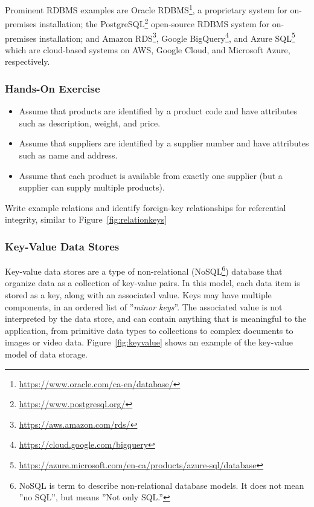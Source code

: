 Prominent RDBMS examples are Oracle RDBMS\footnote{\url{https://www.oracle.com/ca-en/database/}}, a proprietary system for on-premises installation; the PostgreSQL\footnote{\url{https://www.postgresql.org/}} open-source RDBMS system for on-premises installation; and Amazon RDS\footnote{\url{https://aws.amazon.com/rds/}}, Google BigQuery\footnote{\url{https://cloud.google.com/bigquery}}, and Azure SQL\footnote{\url{https://azure.microsoft.com/en-ca/products/azure-sql/database}} which are cloud-based systems on AWS, Google Cloud, and Microsoft Azure, respectively.

\begin{exerciseboxpaper}
\subsubsection*{Hands-On Exercise} 

\begin{itemize}
	\item Assume that products are identified by a product code and have attributes such as description, weight, and price. 
	\item Assume that suppliers are identified by a supplier number and have attributes such as name and address.
	\item Assume that each product is available from exactly one supplier (but a supplier can supply multiple products).
\end{itemize}

\vspace{.5\baselineskip}
Write example relations and identify foreign-key relationships for referential integrity, similar to Figure~\ref{fig:relationkeys}
\end{exerciseboxpaper}


\subsubsection*{Key-Value Data Stores}

Key-value data stores are a type of non-relational (NoSQL\footnote{NoSQL is term to describe non-relational database models. It does not mean ''no SQL'', but means ''Not only SQL.''}) database that organize data as a collection of key-value pairs. In this model, each data item is stored as a key, along with an associated value. Keys may have multiple components, in an ordered list of ''\emph{minor keys}''. The associated value is not interpreted by the data store, and can contain anything that is meaningful to the application, from primitive data types to collections to complex documents to images or video data. Figure~\ref{fig:keyvalue} shows an example of the key-value model of data storage.

